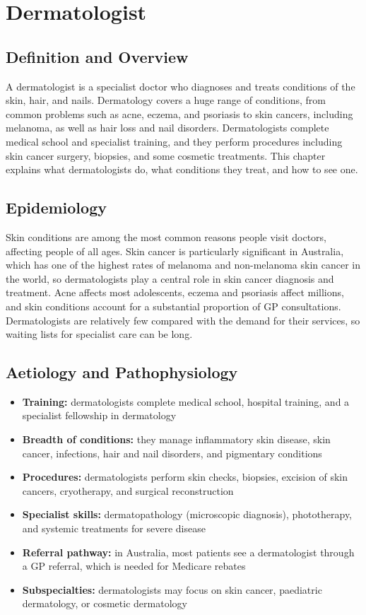 \chapter{Dermatologist}

\section*{Definition and Overview}
A dermatologist is a specialist doctor who diagnoses and treats conditions of the skin, hair, and nails. Dermatology covers a huge range of conditions, from common problems such as acne, eczema, and psoriasis to skin cancers, including melanoma, as well as hair loss and nail disorders. Dermatologists complete medical school and specialist training, and they perform procedures including skin cancer surgery, biopsies, and some cosmetic treatments. This chapter explains what dermatologists do, what conditions they treat, and how to see one.

\section*{Epidemiology}
Skin conditions are among the most common reasons people visit doctors, affecting people of all ages. Skin cancer is particularly significant in Australia, which has one of the highest rates of melanoma and non-melanoma skin cancer in the world, so dermatologists play a central role in skin cancer diagnosis and treatment. Acne affects most adolescents, eczema and psoriasis affect millions, and skin conditions account for a substantial proportion of GP consultations. Dermatologists are relatively few compared with the demand for their services, so waiting lists for specialist care can be long.

\section*{Aetiology and Pathophysiology}
\begin{itemize}
    \item \textbf{Training:} dermatologists complete medical school, hospital training, and a specialist fellowship in dermatology
    \item \textbf{Breadth of conditions:} they manage inflammatory skin disease, skin cancer, infections, hair and nail disorders, and pigmentary conditions
    \item \textbf{Procedures:} dermatologists perform skin checks, biopsies, excision of skin cancers, cryotherapy, and surgical reconstruction
    \item \textbf{Specialist skills:} dermatopathology (microscopic diagnosis), phototherapy, and systemic treatments for severe disease
    \item \textbf{Referral pathway:} in Australia, most patients see a dermatologist through a GP referral, which is needed for Medicare rebates
    \item \textbf{Subspecialties:} dermatologists may focus on skin cancer, paediatric dermatology, or cosmetic dermatology
\end{itemize}

